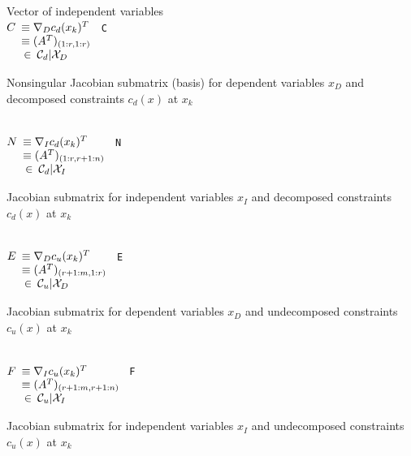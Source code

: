 {\begin{tabbing}
		\> Vector of independent variables \\
$C		\begin{array}[t]{l}
			\equiv \nabla_D c_d(x_k)^T \\
			\equiv (A^T)_{(1:r,1:r)} \\
			\:\in\: \mathcal{C}_d|\mathcal{X}_D
		\end{array}$
	\> \texttt{C}
		\> \parbox[t]{50ex}{
				Nonsingular Jacobian submatrix (basis) for dependent variables $x_D$
				and decomposed constraints $c_d(x)$ at $x_k$ } \\
$N		\begin{array}[t]{l}
			\equiv \nabla_I c_d(x_k)^T \\
			\equiv (A^T)_{(1:r,r+1:n)} \\
			\:\in\: \mathcal{C}_d|\mathcal{X}_I
		\end{array}$
	\> \texttt{N}
		\> \parbox[t]{50ex}{
				Jacobian submatrix for independent variables $x_I$ and decomposed
				constraints $c_d(x)$ at $x_k$ } \\
$E		\begin{array}[t]{l}
			\equiv \nabla_D c_u(x_k)^T \\
			\equiv (A^T)_{(r+1:m,1:r)} \\
			\:\in\: \mathcal{C}_u|\mathcal{X}_D
		\end{array}$
	\> \texttt{E}
		\> \parbox[t]{50ex}{
				Jacobian submatrix for dependent variables $x_D$
				and undecomposed constraints $c_u(x)$ at $x_k$ } \\
$F		\begin{array}[t]{l}
			\equiv \nabla_I c_u(x_k)^T \\
			\equiv (A^T)_{(r+1:m,r+1:n)} \\
			\:\in\: \mathcal{C}_u|\mathcal{X}_I
		\end{array}$
	\> \texttt{F}
		\> \parbox[t]{50ex}{
				Jacobian submatrix for independent variables $x_I$
				and undecomposed constraints $c_u(x)$ at $x_k$ } \\
\end{tabbing}

\esinglespace}

